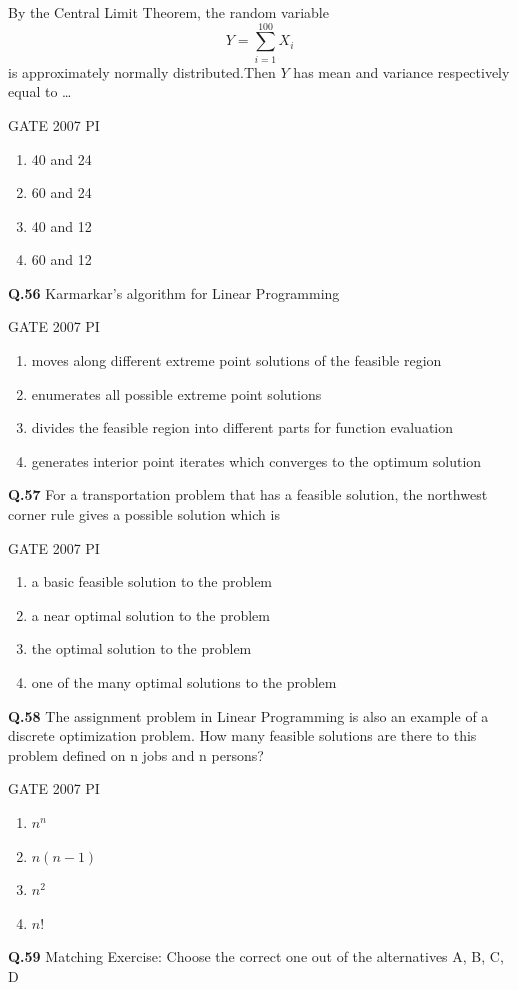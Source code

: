 \documentclass[journal,12pt,onecolumn]{exam}
\theoremstyle{remark}
\begin{document}
By the Central Limit Theorem, the random variable  
\[
Y = \sum_{i=1}^{100} X_i
\]
is approximately normally distributed.Then $Y$ has mean and variance respectively equal to \dots

\hfill{GATE 2007 PI}
\begin{enumerate}
    \item 40 and 24
    \item 60 and 24
    \item 40 and 12
    \item 60 and 12
    \end{enumerate}
\noindent
\textbf{Q.56}
Karmarkar's algorithm for Linear Programming

\hfill{GATE 2007 PI}
\begin{enumerate}
    \item moves along different extreme point solutions of the feasible region
    \item enumerates all possible extreme point solutions
    \item divides the feasible region into different parts for function evaluation
    \item generates interior point iterates which converges to the optimum solution
\end{enumerate}
\noindent
\textbf{Q.57}
For a transportation problem that has a feasible solution, the northwest corner rule gives a possible solution which is

\hfill{GATE 2007 PI}
\begin{enumerate}
    \item a basic feasible solution to the problem
    \item a near optimal solution to the problem
    \item the optimal solution to the problem
    \item one of the many optimal solutions to the problem
    \end{enumerate}
    \noindent
    \textbf{Q.58}
The assignment problem in Linear Programming is also an example of a discrete optimization problem. How many feasible solutions are there to this problem defined on n jobs and n persons?

\hfill{GATE 2007 PI}
\begin{enumerate}
    \item $n^n$
    \item $n(n-1)$
    \item $n^2$
    \item $n!$
\end{enumerate}
\noindent
\textbf{Q.59}
{Matching Exercise:} Choose the correct one out of the alternatives A, B, C, D
\end{document}
